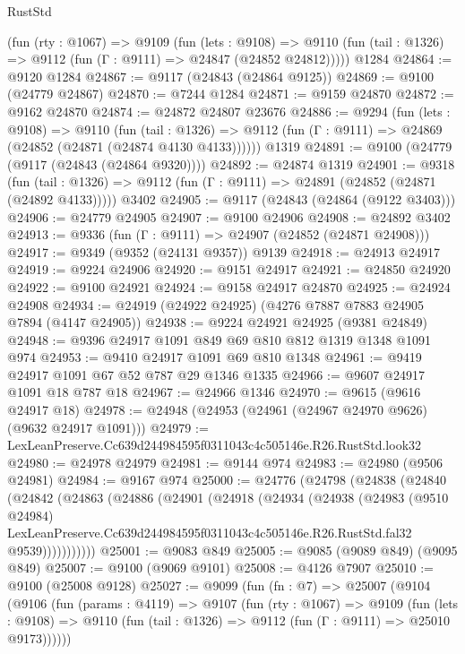 \begin{lexlean}{RustStd}
\begin{coremodule}
    (fun (rty : @1067) =>
    @9109
      (fun (lets : @9108) =>
      @9110 (fun (tail : @1326) => @9112 (fun (Γ : @9111) => @24847 (@24852 @24812)))))
    @1284
@24864 := @9120 @1284
@24867 := @9117 (@24843 (@24864 @9125))
@24869 := @9100 (@24779 @24867)
@24870 := @7244 @1284
@24871 := @9159 @24870
@24872 := @9162 @24870
@24874 := @24872 @24807 @23676
@24886 := @9294
    (fun (lets : @9108) =>
    @9110
      (fun (tail : @1326) =>
      @9112 (fun (Γ : @9111) => @24869 (@24852 (@24871 (@24874 @4130 @4133))))))
    @1319
@24891 := @9100 (@24779 (@9117 (@24843 (@24864 @9320))))
@24892 := @24874 @1319
@24901 := @9318
    (fun (tail : @1326) => @9112 (fun (Γ : @9111) => @24891 (@24852 (@24871 (@24892 @4133)))))
    @3402
@24905 := @9117 (@24843 (@24864 (@9122 @3403)))
@24906 := @24779 @24905
@24907 := @9100 @24906
@24908 := @24892 @3402
@24913 := @9336 (fun (Γ : @9111) => @24907 (@24852 (@24871 @24908)))
@24917 := @9349 (@9352 (@24131 @9357)) @9139
@24918 := @24913 @24917
@24919 := @9224 @24906
@24920 := @9151 @24917
@24921 := @24850 @24920
@24922 := @9100 @24921
@24924 := @9158 @24917 @24870
@24925 := @24924 @24908
@24934 := @24919 (@24922 @24925) (@4276 @7887 @7883 @24905 @7894 (@4147 @24905))
@24938 := @9224 @24921 @24925 (@9381 @24849)
@24948 := @9396 @24917 @1091 @849 @69 @810 @812 @1319 @1348 @1091 @974
@24953 := @9410 @24917 @1091 @69 @810 @1348
@24961 := @9419 @24917 @1091 @67 @52 @787 @29 @1346 @1335
@24966 := @9607 @24917 @1091 @18 @787 @18
@24967 := @24966 @1346
@24970 := @9615 (@9616 @24917 @18)
@24978 := @24948 (@24953 (@24961 (@24967 @24970 @9626) (@9632 @24917 @1091)))
@24979 := LexLeanPreserve.Cc639d244984595f0311043c4c505146e.R26.RustStd.look32
@24980 := @24978 @24979
@24981 := @9144 @974
@24983 := @24980 (@9506 @24981)
@24984 := @9167 @974
@25000 := @24776
    (@24798
      (@24838
        (@24840
          (@24842
            (@24863
              (@24886
                (@24901
                  (@24918
                    (@24934
                      (@24938
                        (@24983
                          (@9510 @24984)
                          LexLeanPreserve.Cc639d244984595f0311043c4c505146e.R26.RustStd.fal32
                          @9539)))))))))))
@25001 := @9083 @849
@25005 := @9085 (@9089 @849) (@9095 @849)
@25007 := @9100 (@9069 @9101)
@25008 := @4126 @7907
@25010 := @9100 (@25008 @9128)
@25027 := @9099
    (fun (fn : @7) =>
    @25007
      (@9104
        (@9106
          (fun (params : @4119) =>
          @9107
            (fun (rty : @1067) =>
            @9109
              (fun (lets : @9108) =>
              @9110 (fun (tail : @1326) => @9112 (fun (Γ : @9111) => @25010 @9173))))))

\end{coremodule}
\end{lexlean}
